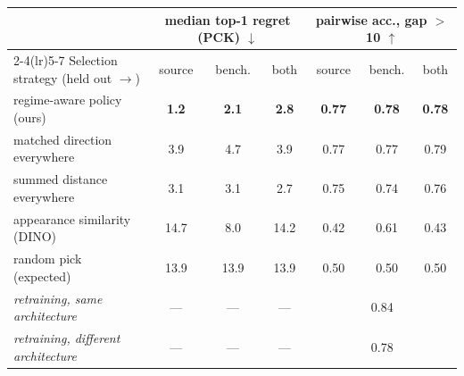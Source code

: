 \begin{tabular}{l ccc ccc}
\toprule
 & \multicolumn{3}{c}{median top-1 regret (PCK) $\downarrow$} & \multicolumn{3}{c}{pairwise acc., gap $>$10 $\uparrow$} \\
\cmidrule(lr){2-4}\cmidrule(lr){5-7}
Selection strategy \hfill (held out $\rightarrow$) & source & bench. & both & source & bench. & both \\
\midrule
regime-aware policy (ours) & \textbf{1.2} & \textbf{2.1} & \textbf{2.8} & \textbf{0.77} & \textbf{0.78} & \textbf{0.78} \\
matched direction everywhere & 3.9 & 4.7 & 3.9 & 0.77 & 0.77 & 0.79 \\
summed distance everywhere & 3.1 & 3.1 & 2.7 & 0.75 & 0.74 & 0.76 \\
appearance similarity (DINO) & 14.7 & 8.0 & 14.2 & 0.42 & 0.61 & 0.43 \\
random pick (expected) & 13.9 & 13.9 & 13.9 & 0.50 & 0.50 & 0.50 \\
\midrule
\emph{retraining, same architecture} & --- & --- & --- & \multicolumn{3}{c}{0.84} \\
\emph{retraining, different architecture} & --- & --- & --- & \multicolumn{3}{c}{0.78} \\
\bottomrule
\end{tabular}
